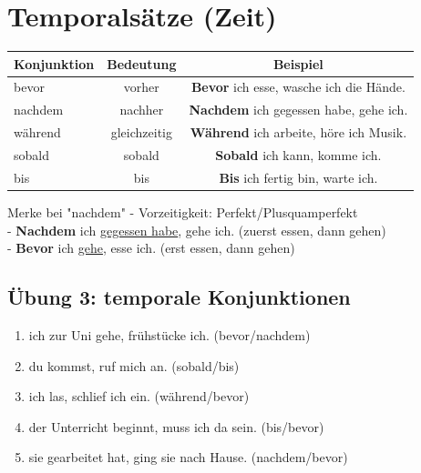 
\section{Temporalsätze (Zeit)}
\label{sec:B1Temporal}

\begin{center}
\begin{tabular}{|l|c|c|}
\hline
Konjunktion & Bedeutung & Beispiel \\ \hline
bevor & vorher & \textbf{Bevor} ich esse, wasche ich die Hände. \\ \hline
nachdem & nachher & \textbf{Nachdem} ich gegessen habe, gehe ich. \\ \hline
während & gleichzeitig & \textbf{Während} ich arbeite, höre ich Musik. \\ \hline
sobald & sobald & \textbf{Sobald} ich kann, komme ich. \\ \hline
bis & bis & \textbf{Bis} ich fertig bin, warte ich. \\ \hline
\end{tabular}
\end{center}

\begin{tippbox}{Merke bei "nachdem"}
- Vorzeitigkeit: Perfekt/Plusquamperfekt\\
- \textbf{Nachdem} ich \underline{gegessen habe}, gehe ich. (zuerst essen, dann gehen)\\
- \textbf{Bevor} ich \underline{gehe}, esse ich. (erst essen, dann gehen)
\end{tippbox}

\subsection*{Übung 3: temporale Konjunktionen}
\begin{enumerate}
    \item \underline{\hspace{1cm}} ich zur Uni gehe, frühstücke ich. (bevor/nachdem)
    \item \underline{\hspace{1cm}} du kommst, ruf mich an. (sobald/bis)
    \item \underline{\hspace{1cm}} ich las, schlief ich ein. (während/bevor)
    \item \underline{\hspace{1cm}} der Unterricht beginnt, muss ich da sein. (bis/bevor)
    \item \underline{\hspace{1cm}} sie gearbeitet hat, ging sie nach Hause. (nachdem/bevor)
\end{enumerate}

